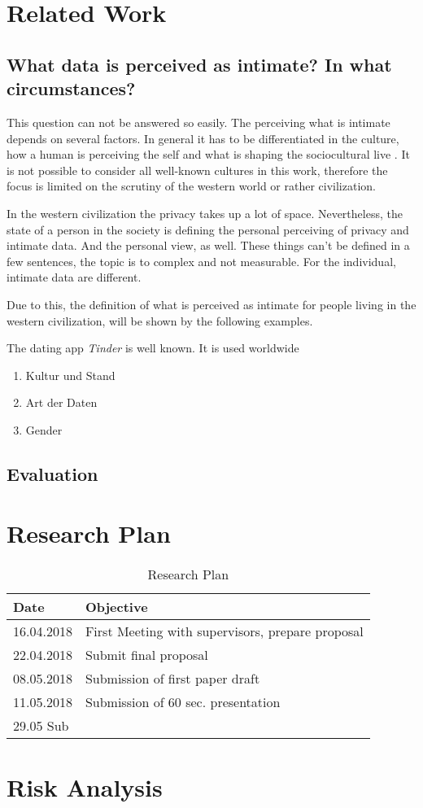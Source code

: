 \documentclass[journal]{vgtc}                %
\begin{document}
\section{Related Work}

\subsection{What data is perceived as intimate? In what circumstances?}
This question can not be answered so easily. The perceiving what is intimate depends on several factors.
In general it has to be differentiated in the culture, how a human is perceiving the self and what is shaping the sociocultural live \cite{carrithers1985category}. It is not possible to consider all well-known cultures in this work, therefore the focus is limited on the scrutiny of the western world or rather civilization. 

In the western civilization the privacy takes up a lot of space. Nevertheless, the state of a person in the society is defining the personal perceiving of privacy and intimate data. And the personal view, as well.
These things can't be defined in a few sentences, the topic is to complex and not measurable. For the individual, intimate data are different.

Due to this, the definition of what is perceived as intimate for people living in the western civilization, will be shown by the following examples.

The dating app \textit{Tinder} is well known. It is used worldwide 


\begin{enumerate} 
	\item Kultur und Stand
	\item Art der Daten
	\item Gender
\end{enumerate}

\subsection{Evaluation}

\section{Research Plan}

\begin{table}[H]
  \caption{Research Plan}
  \label{tab:vis_accept}
  \scriptsize
  \begin{center}
    \begin{tabular}{ll}
      Date & Objective \\
    \hline
      16.04.2018 &  First Meeting  with supervisors, prepare proposal \\
      22.04.2018 & Submit final proposal \\
      08.05.2018 & Submission of first paper draft \\
      11.05.2018 & Submission of 60 sec. presentation \\
      29.05 Sub
	\end{tabular}
  \end{center}
\end{table}


\section{Risk Analysis}

\printbibliography
\end{document}
